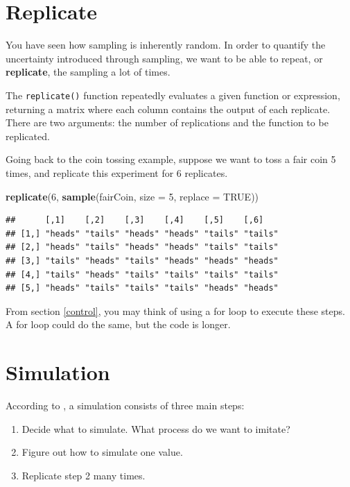 \documentclass[
]{book}
\newenvironment{Shaded}{\begin{snugshade}}{\end{snugshade}}
\newcommand{\AttributeTok}[1]{\textcolor[rgb]{0.13,0.29,0.53}{#1}}
\newcommand{\ConstantTok}[1]{\textcolor[rgb]{0.56,0.35,0.01}{#1}}
\newcommand{\DecValTok}[1]{\textcolor[rgb]{0.00,0.00,0.81}{#1}}
\newcommand{\FunctionTok}[1]{\textcolor[rgb]{0.13,0.29,0.53}{\textbf{#1}}}
\newcommand{\NormalTok}[1]{#1}
\providecommand{\tightlist}{%
  \setlength{\itemsep}{0pt}\setlength{\parskip}{0pt}}
\theoremstyle{definition}
\theoremstyle{definition}
\theoremstyle{definition}
\theoremstyle{definition}
\theoremstyle{remark}
\begin{document}
\hypertarget{replicate}{%
\section{Replicate}\label{replicate}}

You have seen how sampling is inherently random. In order to quantify the uncertainty introduced through sampling, we want to be able to repeat, or \textbf{replicate}, the sampling a lot of times.

The \texttt{replicate()} function repeatedly evaluates a given function or expression, returning a matrix where each column contains the output of each replicate. There are two arguments: the number of replications and the function to be replicated.

Going back to the coin tossing example, suppose we want to toss a fair coin 5 times, and replicate this experiment for 6 replicates.

\begin{Shaded}
\begin{Highlighting}[]
\FunctionTok{replicate}\NormalTok{(}\DecValTok{6}\NormalTok{, }\FunctionTok{sample}\NormalTok{(fairCoin, }\AttributeTok{size =} \DecValTok{5}\NormalTok{, }\AttributeTok{replace =} \ConstantTok{TRUE}\NormalTok{))}
\end{Highlighting}
\end{Shaded}

\begin{verbatim}
##      [,1]    [,2]    [,3]    [,4]    [,5]    [,6]   
## [1,] "heads" "tails" "heads" "heads" "tails" "tails"
## [2,] "heads" "tails" "heads" "heads" "tails" "tails"
## [3,] "tails" "heads" "tails" "heads" "heads" "heads"
## [4,] "tails" "heads" "tails" "tails" "tails" "tails"
## [5,] "heads" "tails" "tails" "tails" "heads" "heads"
\end{verbatim}

From section \ref{control}, you may think of using a for loop to execute these steps. A for loop could do the same, but the code is longer.

\hypertarget{simulation}{%
\section{Simulation}\label{simulation}}

According to \citet{exploring}, a simulation consists of three main steps:

\begin{enumerate}
\def\labelenumi{\arabic{enumi}.}
\tightlist
\item
  Decide what to simulate. What process do we want to imitate?
\item
  Figure out how to simulate one value.
\item
  Replicate step 2 many times.
\end{enumerate}
\end{document}
